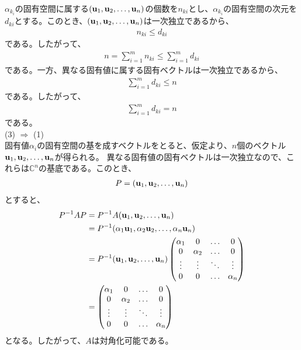 \documentclass[a4paper,11pt]{jsarticle}
\numberwithin{equation}{section}
\begin{document}
$\alpha_{k_i}$の固有空間に属する$(\vb{u}_1, \vb{u}_2, \dots, \vb{u}_n)$の個数を$n_{ki}$とし、$\alpha_{k_i}$の固有空間の次元を$d_{ki}$とする。このとき、$(\vb{u}_1, \vb{u}_2, \dots, \vb{u}_n)$は一次独立であるから、
\begin{align}
  n_{ki} \leq  d_{ki}
\end{align}
である。したがって、
\begin{align}
  n = \sum_{i=1}^{m} n_{ki} \leq \sum_{i=1}^{m} d_{ki}
\end{align}
である。一方、異なる固有値に属する固有ベクトルは一次独立であるから、
\begin{align}
  \sum_{i=1}^{m} d_{ki} \leq n
\end{align}
である。したがって、
\begin{align}
  \sum_{i=1}^{m} d_{ki} = n
\end{align}
である。\\
(3) $\Rightarrow$ (1)\\
固有値$\alpha_i$の固有空間の基を成すベクトルをとると、仮定より、$n$個のベクトル$\vb{u}_1, \vb{u}_2, \dots, \vb{u}_n$が得られる。
異なる固有値の固有ベクトルは一次独立なので、これらは$\mathbb{C}^n$の基底である。このとき、
\begin{align}
  P = (\vb{u}_1, \vb{u}_2, \dots, \vb{u}_n)
\end{align}
とすると、
\begin{align}
  P^{-1}AP &= P^{-1}A(\vb{u}_1, \vb{u}_2, \dots, \vb{u}_n)\\
  &= P^{-1}(\alpha_1\vb{u}_1, \alpha_2\vb{u}_2, \dots, \alpha_n\vb{u}_n)\\
  &= P^{-1}(\vb{u}_1, \vb{u}_2, \dots, \vb{u}_n)
  \begin{pmatrix}
    \alpha_1 & 0 & \dots & 0\\
    0 & \alpha_2 & \dots & 0\\
    \vdots & \vdots & \ddots & \vdots\\
    0 & 0 & \dots & \alpha_n
  \end{pmatrix}\\
  &=
  \begin{pmatrix}
    \alpha_1 & 0 & \dots & 0\\
    0 & \alpha_2 & \dots & 0\\
    \vdots & \vdots & \ddots & \vdots\\
    0 & 0 & \dots & \alpha_n
  \end{pmatrix}
\end{align}
となる。したがって、$A$は対角化可能である。\hfill\qedsymbol\\
\end{document}
